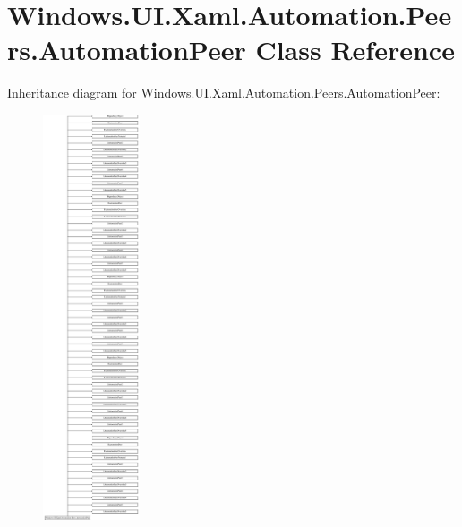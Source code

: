 \hypertarget{class_windows_1_1_u_i_1_1_xaml_1_1_automation_1_1_peers_1_1_automation_peer}{}\section{Windows.\+U\+I.\+Xaml.\+Automation.\+Peers.\+Automation\+Peer Class Reference}
\label{class_windows_1_1_u_i_1_1_xaml_1_1_automation_1_1_peers_1_1_automation_peer}
Inheritance diagram for Windows.\+U\+I.\+Xaml.\+Automation.\+Peers.\+Automation\+Peer\+:\begin{figure}[H]
\begin{center}
\leavevmode
\includegraphics[height=12.000000cm]{class_windows_1_1_u_i_1_1_xaml_1_1_automation_1_1_peers_1_1_automation_peer}
\end{center}
\end{figure}
